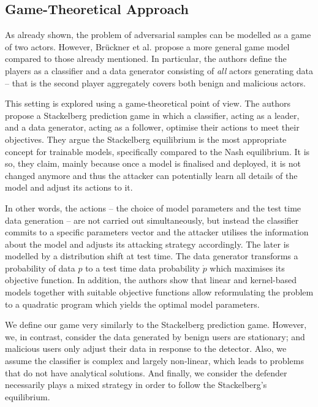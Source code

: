 \subsection{Game-Theoretical Approach}

As already shown, the problem of adversarial samples can be modelled as
a game of two actors. However, Brückner et al. \cite{stackelberg_games} propose a more general
game model compared to those already mentioned. In particular, the
authors define the players as a classifier and a data generator
consisting of \emph{all} actors generating data – that is the second
player aggregately covers both benign and malicious actors.

This setting is explored using a game-theoretical point of view. The
authors propose a Stackelberg prediction game in which a classifier,
acting as a leader, and a data generator, acting as a follower, optimise
their actions to meet their objectives. They argue the Stackelberg
equilibrium is the most appropriate concept for trainable models,
specifically compared to the Nash equilibrium. It is so, they claim,
mainly because once a model is finalised and deployed, it is not changed
anymore and thus the attacker can potentially learn all details of the
model and adjust its actions to it.

In other words, the actions – the choice of model parameters and the
test time data generation – are not carried out simultaneously, but
instead the classifier commits to a specific parameters vector and the
attacker utilises the information about the model and adjusts its
attacking strategy accordingly. The later is modelled by a distribution
shift at test time. The data generator transforms a probability of data
$p$ to a test time data probability $\dot{p}$ which maximises its
objective function. In addition, the authors show that linear and
kernel-based models together with suitable objective functions allow
reformulating the problem to a quadratic program which yields the
optimal model parameters.

We define our game very similarly to the Stackelberg prediction game. However, we, in contrast, consider the data generated by benign users are stationary; and malicious users only adjust their data in response to the detector. Also, we assume the classifier is complex and largely non-linear, which leads to problems that do not have analytical solutions. And finally, we consider the defender necessarily plays a mixed strategy in order to follow the Stackelberg's equilibrium.

